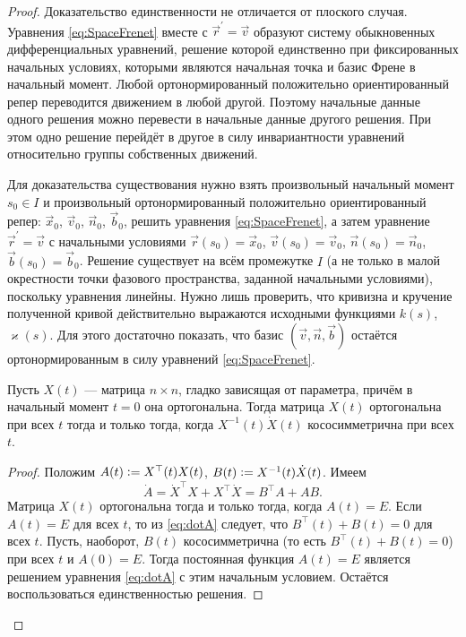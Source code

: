 \begin{proof}
	Доказательство единственности не отличается от плоского случая. Уравнения \eqref{eq:SpaceFrenet} вместе с $\vec{r}^\prime = \vec{v}$ образуют систему обыкновенных дифференциальных уравнений, решение которой единственно при фиксированных начальных условиях, которыми являются начальная точка и базис Френе в начальный момент. Любой ортонормированный положительно ориентированный репер переводится движением в любой другой. Поэтому начальные данные одного решения можно перевести в начальные данные другого решения. При этом одно решение перейдёт в другое в силу инвариантности уравнений относительно группы собственных движений.

	Для доказательства существования нужно взять произвольный начальный момент $s_0 \in I$ и произвольный ортонормированный положительно ориентированный репер: $\vec{x}_0$, $\vec{v}_0$, $\vec{n}_0$, $\vec{b}_0$, решить уравнения \eqref{eq:SpaceFrenet}, а затем уравнение $\vec{r}^\prime = \vec{v}$ с начальными условиями $\vec{r}(s_0) = \vec{x}_0$, $\vec{v}(s_0) = \vec{v}_0$, $\vec{n}(s_0) = \vec{n}_0$, $\vec{b}(s_0) = \vec{b}_0$. Решение существует на всём промежутке $I$ (а не только в малой окрестности точки фазового пространства, заданной начальными условиями), поскольку уравнения линейны. Нужно лишь проверить, что кривизна и кручение полученной кривой действительно выражаются исходными функциями $k(s)$, $\varkappa(s)$. Для этого достаточно показать, что базис $(\vec{v}, \vec{n}, \vec{b})$ остаётся ортонормированным в силу уравнений \eqref{eq:SpaceFrenet}.

	\begin{lemma} \label{eq:FunnyMatrixLemma}
		Пусть $X(t)$ --- матрица $n \times n$, гладко зависящая от параметра, причём в начальный момент $t = 0$ она ортогональна. Тогда матрица $X(t)$ ортогональна при всех $t$ тогда и только тогда, когда $X^{-1}(t)\dot{X}(t)$ кососимметрична при всех $t$.
	\end{lemma}

	\begin{proof}
		Положим $A(t) \vcentcolon = X^\top(t)X(t)$, $B(t) \vcentcolon = X^{-1}(t)\dot{X}(t)$. Имеем
		\begin{equation} \label{eq:dotA}
			\dot{A} = \dot{X}^\top X + X^\top\dot{X} = B^\top A + AB.
		\end{equation}
		Матрица $X(t)$ ортогональна тогда и только тогда, когда $A(t) = E$. Если $A(t) = E$ для всех $t$, то из \eqref{eq:dotA} следует, что $B^\top(t) + B(t) = 0$ для всех $t$. Пусть, наоборот, $B(t)$ кососимметрична (то есть $B^\top(t) + B(t) = 0$) при всех $t$ и $A(0) = E$. Тогда постоянная функция $A(t) = E$ является решением уравнения \eqref{eq:dotA} с этим начальным условием. Остаётся воспользоваться единственностью решения.
	\end{proof}


\end{proof}

